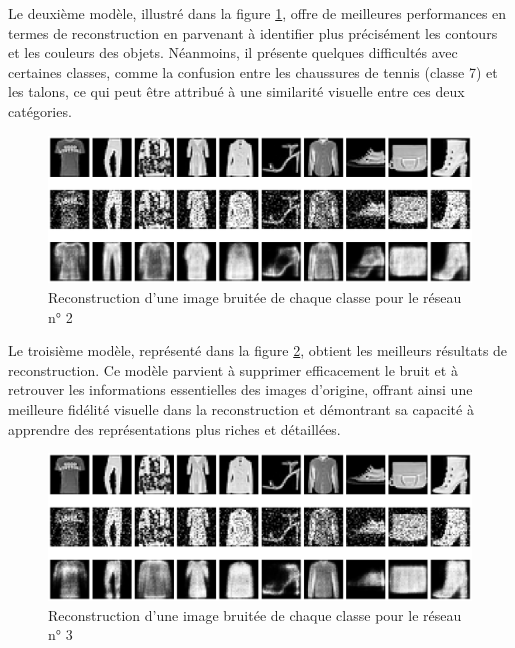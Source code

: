 \documentclass{article}
\begin{document}
Le deuxième modèle, illustré dans la figure \ref{fig:reconstruct_noisy_all_medium}, offre de meilleures performances en termes de reconstruction en parvenant à identifier plus précisément les contours et les couleurs des objets. Néanmoins, il présente quelques difficultés avec certaines classes, comme la confusion entre les chaussures de tennis (classe 7) et les talons, ce qui peut être attribué à une similarité visuelle entre ces deux catégories.

\begin{figure}[htbp]
    \centering
    \includegraphics*[width=\textwidth]{reconstruct_noisy_all_medium.pdf}
    \caption{Reconstruction d'une image bruitée de chaque classe pour le réseau n° 2}
    \label{fig:reconstruct_noisy_all_medium}
\end{figure}

Le troisième modèle, représenté dans la figure \ref{fig:reconstruct_noisy_all_big}, obtient les meilleurs résultats de reconstruction. Ce modèle parvient à supprimer efficacement le bruit et à retrouver les informations essentielles des images d'origine, offrant ainsi une meilleure fidélité visuelle dans la reconstruction et démontrant sa capacité à apprendre des représentations plus riches et détaillées.

\begin{figure}[htbp]
    \centering
    \includegraphics*[width=\textwidth]{reconstruct_noisy_all_big.pdf}
    \caption{Reconstruction d'une image bruitée de chaque classe pour le réseau n° 3}
    \label{fig:reconstruct_noisy_all_big}
\end{figure}
\end{document}
